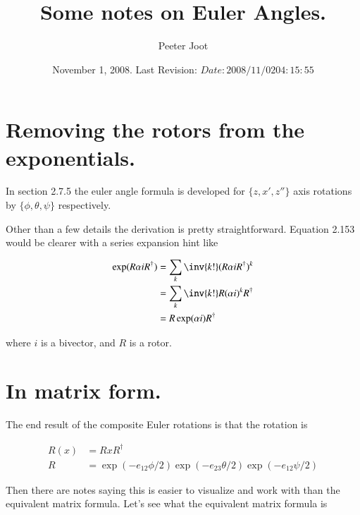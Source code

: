 \documentclass{article}      %
\title{Some notes on Euler Angles.} %
\author{Peeter Joot}         %
\date{ November 1, 2008. Last Revision: $Date: 2008/11/02 04:15:55 $ } %
\begin{document}

\maketitle{}
\tableofcontents

\section{ Removing the rotors from the exponentials. }

In \cite{doran2003gap} section 2.7.5 the euler angle formula is 
developed for $\{z,x',z''\}$ axis rotations by $\{\phi, \theta, \psi\}$
respectively.

Other than a few details the derivation is pretty straightforward.  Equation
2.153 would be clearer with a series expansion hint like

\begin{align*}
\exp(R \alpha i R^\dagger) 
&= \sum_k \inv{k!} (R \alpha i R^\dagger)^k \\
&= \sum_k \inv{k!} R (\alpha i)^k R^\dagger \\
&= R \exp(\alpha i) R^\dagger
\end{align*}

where $i$ is a bivector, and $R$ is a rotor.

\section{ In matrix form. }

The end result of the composite Euler rotations is that the rotation is

\begin{align*}
R(x) &= R x R^\dagger \\
R &= \exp(-e_{12}\phi/2) \exp(-e_{23}\theta/2) \exp(-e_{12}\psi/2)
\end{align*}

Then there are notes saying this is easier to visualize and work with than
the equivalent matrix formula.  Let's see what the equivalent matrix formula
is



\end{document}
